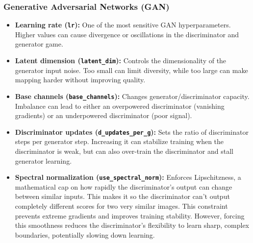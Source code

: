 \documentclass[runningheads]{llncs}
\begin{document}
\subsubsection{Generative Adversarial Networks (GAN)}
\begin{itemize}
    \item \textbf{Learning rate (\texttt{lr}):} One of the most sensitive GAN hyperparameters. Higher values can cause divergence or oscillations in the discriminator and generator game.
    \item \textbf{Latent dimension (\texttt{latent\_dim}):} Controls the dimensionality of the generator input noise. Too small can limit diversity, while too large can make mapping harder without improving quality.
    \item \textbf{Base channels (\texttt{base\_channels}):} Changes generator/discriminator capacity. Imbalance can lead to either an overpowered discriminator (vanishing gradients) or an underpowered discriminator (poor signal).
    \item \textbf{Discriminator updates (\texttt{d\_updates\_per\_g}):} Sets the ratio of discriminator steps per generator step. Increasing it can stabilize training when the discriminator is weak, but can also over-train the discriminator and stall generator learning.
    \item \textbf{Spectral normalization (\texttt{use\_spectral\_norm}):} Enforces Lipschitzness, a mathematical cap on how rapidly the discriminator's output can change between similar inputs. This makes it so the discriminator can't output completely different scores for two very similar images. This constraint prevents extreme gradients and improves training stability. However, forcing this smoothness reduces the discriminator's flexibility to learn sharp, complex boundaries, potentially slowing down learning.
\end{itemize}
\end{document}
